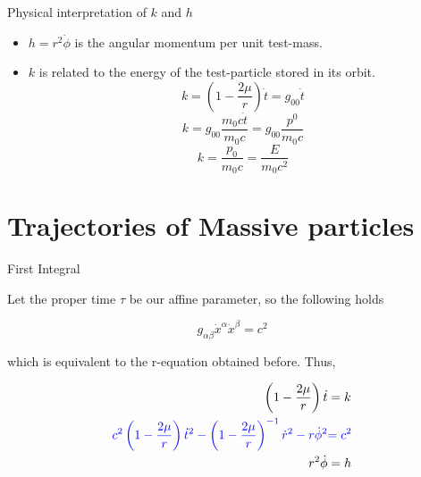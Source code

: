 \documentclass[xcolor=dvipsnames]{beamer}
\begin{document}
\begin{frame}{Physical interpretation of $k$ and $h$}
    
    \begin{itemize}
        \item $h = r^2 \dot{\phi}$ is the angular momentum per unit test-mass. 
        \item $k$ is related to the energy of the test-particle stored in its orbit. 
        $$k =  \left( 1 - \frac{2 \mu}{r} \right) \dot{t} = g_{00} \dot{t}$$
        $$k = g_{00} \frac{m_0 c \dot{t}}{m_0 c} = g_{00} \frac{p^0}{m_0 c}$$
        $$k = \frac{p_0}{m_0 c} = \frac{E}{m_0 c^2}$$
    \end{itemize}
    
\end{frame}



\section{Trajectories of Massive particles}


\begin{frame}{First Integral}
    
Let the proper time $\tau$ be our affine parameter, so the following holds

\begin{equation*}
    g_{\alpha \beta} \dot{x}^\alpha \dot{x}^\beta = c^2
\end{equation*}

which is equivalent to the r-equation obtained before. Thus, 
    
    
\begin{eqnarray*}
\left( 1 - \frac{2 \mu}{r} \right) \dot{t} &= k \\
{\color{blue} c^2 \left( 1 - \frac{2 \mu}{r} \right) \dot{t}^2  - \left( 1 - \frac{2 \mu}{r} \right)^{-1} \dot{r}^2 - r\dot{\phi}^2 } &{\color{blue}= c^2} \\
r^2 \dot{\phi} &= h
\end{eqnarray*}
    
\end{frame}
\end{document}
